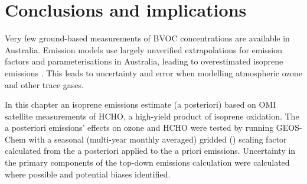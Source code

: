       
    
    
\section{Conclusions and implications}
  \label{BioIsop:conclusions}
  
  
  Very few ground-based measurements of BVOC concentrations are available in Australia.
  Emission models use largely unverified extrapolations for emission factors and parameterisations in Australia, leading to overestimated isoprene emissions \parencite{Emmerson2016}.
  This leads to uncertainty and error when modelling atmospheric ozone and other trace gases.
  
  In this chapter an isoprene emissions estimate (a posteriori)  based on OMI satellite measurements of HCHO, a high-yield product of isoprene oxidation.
  The a posteriori emissions' effects on ozone and HCHO were tested by running GEOS-Chem with a seasonal (multi-year monthly averaged) gridded (\lowhr) scaling factor calculated from the a posteriori applied to the a priori emissions.
  Uncertainty in the primary components of the top-down emissions calculation were calculated where possible and potential biases identified.
  

